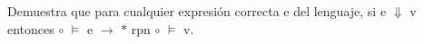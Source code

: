 \documentclass{article}
\begin{document}
\begin{itemize}
\begin{itemize}
            Demuestra que para cualquier expresión correcta e del lenguaje, si e $\Downarrow$ v entonces $\circ$ $\models$ e $\rightarrow$ $*$ rpn $\circ$ $\models$  v.
        \end{itemize}
    \end{itemize}
\end{document}
